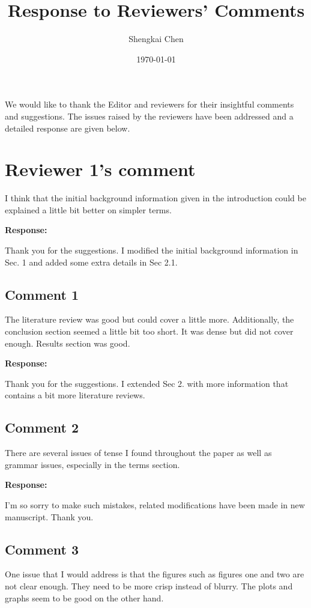 \documentclass{article}
\author{Shengkai Chen}
\date{\today}
\title{Response to Reviewers' Comments}
\begin{document}
\maketitle

We would like to thank the Editor and reviewers for their insightful comments and suggestions. The issues raised by the reviewers have been addressed and a detailed response are given below.

\setlength\parindent{0pt}

\section*{Reviewer 1's comment}
I think that the initial background information given in the introduction could be explained a little bit better on simpler terms.

\textbf{Response:}

Thank you for the suggestions. I modified the initial background information in Sec. 1 and added some extra details in Sec 2.1.

\subsection*{Comment 1} %
The literature review was good but could cover a little more. Additionally, the conclusion section seemed a little bit too short. It was dense but did not cover enough. Results section was good.

\textbf{Response:}
 
Thank you for the suggestions. I extended Sec 2. with more information that contains a bit more literature reviews.

\subsection*{Comment 2} %
There are several issues of tense I found throughout the paper as well as grammar issues, especially in the terms section.

\textbf{Response:}

I'm so sorry to make such mistakes, related modifications have been made in new manuscript. Thank you.

\subsection*{Comment 3} %
One issue that I would address is that the figures such as figures one and two are not clear enough.  They need to be more crisp instead of blurry. The plots and graphs seem to be good on the other hand.
\end{document}
